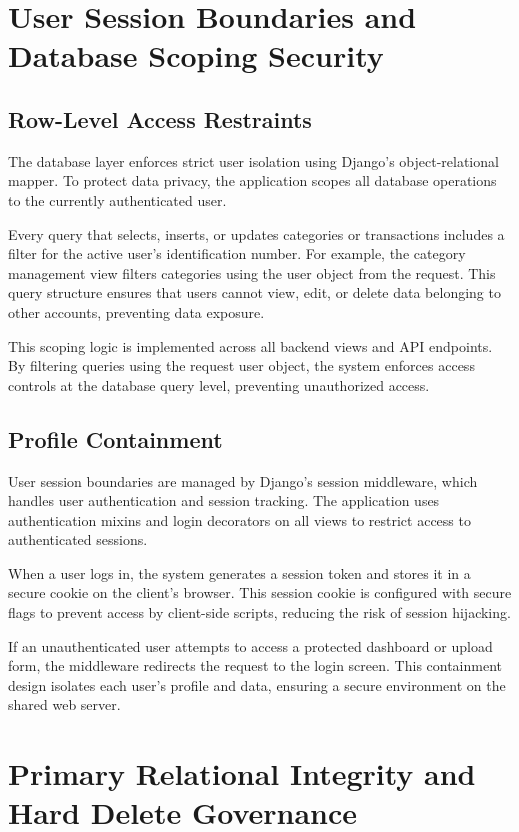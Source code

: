 \section{User Session Boundaries and Database Scoping Security}
\subsection{Row-Level Access Restraints}
The database layer enforces strict user isolation using Django's object-relational mapper. To protect data privacy, the application scopes all database operations to the currently authenticated user.

Every query that selects, inserts, or updates categories or transactions includes a filter for the active user's identification number. For example, the category management view filters categories using the user object from the request. This query structure ensures that users cannot view, edit, or delete data belonging to other accounts, preventing data exposure.

This scoping logic is implemented across all backend views and API endpoints. By filtering queries using the request user object, the system enforces access controls at the database query level, preventing unauthorized access.

\subsection{Profile Containment}
User session boundaries are managed by Django's session middleware, which handles user authentication and session tracking. The application uses authentication mixins and login decorators on all views to restrict access to authenticated sessions.

When a user logs in, the system generates a session token and stores it in a secure cookie on the client's browser. This session cookie is configured with secure flags to prevent access by client-side scripts, reducing the risk of session hijacking.

If an unauthenticated user attempts to access a protected dashboard or upload form, the middleware redirects the request to the login screen. This containment design isolates each user's profile and data, ensuring a secure environment on the shared web server.

\section{Primary Relational Integrity and Hard Delete Governance}
